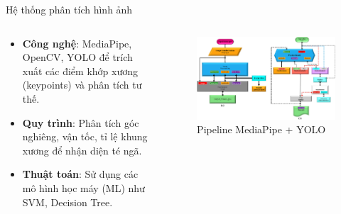 \begin{frame}{Hệ thống phân tích hình ảnh}
    \begin{columns}[T]
        \begin{column}{0.48\textwidth}
            \begin{itemize}
                \item \textbf{Công nghệ}: MediaPipe, OpenCV, YOLO để trích xuất các điểm khớp xương (keypoints) và phân tích tư thế.
                \item \textbf{Quy trình}: Phân tích góc nghiêng, vận tốc, tỉ lệ khung xương để nhận diện té ngã.
                \item \textbf{Thuật toán}: Sử dụng các mô hình học máy (ML) như SVM, Decision Tree.
            \end{itemize}
        \end{column}
        \begin{column}{0.48\textwidth}
            \begin{figure}
                \centering
                \includegraphics[width=\textwidth]{images/media_pose_pipeline.png}
                \caption{Pipeline MediaPipe + YOLO}
            \end{figure}
        \end{column}
    \end{columns}
\end{frame}

